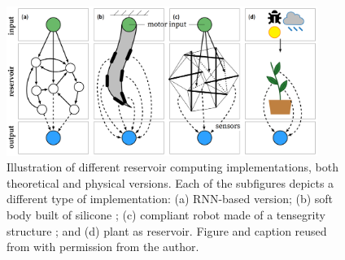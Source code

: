 \begin{figure}[t]
	\centering
    \includegraphics[width=0.9\textwidth]{img/prc-illustration.png}
	\caption[Illustration of different reservoir computing implementations, both theoretical and physical versions.]
	        {Illustration of different reservoir computing implementations, both theoretical and physical versions. 
	        Each of the subfigures depicts a different type of implementation: 
	            (a) RNN-based version; 
	            (b) soft body built of silicone \citep{nakajima_information_2015}; 
	            (c) compliant robot made of a tensegrity structure \citep{caluwaerts_locomotion_2013}; 
	            and (d) plant as reservoir.
    	 	Figure and caption reused from \citet{pieters_reservoir_2022} with permission from the author.}
	\label{fig:prc_examples}
\end{figure}